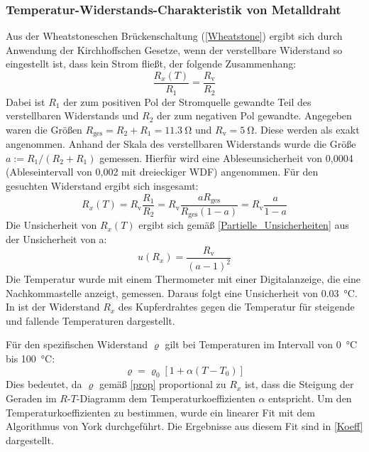 \documentclass[
	a4paper,
	12pt,
	pagesize,
	ngerman
]{scrartcl}
\begin{document}
	\subsubsection{Temperatur-Widerstands-Charakteristik von Metalldraht}
	Aus der Wheatstoneschen Brückenschaltung (\cref{Wheatstone}) ergibt sich durch Anwendung der Kirchhoffschen Gesetze, wenn der verstellbare Widerstand so eingestellt ist, dass kein Strom fließt, der folgende Zusammenhang:
	\begin{equation}
		\frac{R_x(T)}{R_1}=\frac{R_\text{v}}{R_2}
	\end{equation}
	Dabei ist $R_1$ der zum positiven Pol der Stromquelle gewandte Teil des verstellbaren Widerstands und $R_2$ der zum negativen Pol gewandte.
	Angegeben waren die Größen $R_\text{ges}=R_2+R_1=\SI{11,3}{\ohm}$ und $R_\text{v}=\SI{5}{\ohm}$.
	Diese werden als exakt angenommen.
	Anhand der Skala des verstellbaren Widerstands wurde die Größe $a:=R_1/(R_2+R_1)$ gemessen.
	Hierfür wird eine Ableseunsicherheit von 0,0004 (Ableseintervall von 0,002 mit dreieckiger WDF) angenommen.
	Für den gesuchten Widerstand ergibt sich insgesamt:
	\begin{equation}
		R_x(T)=R_\text{v} \frac{R_1}{R_2}=R_\text{v} \frac{aR_\text{ges}}{R_\text{ges}(1-a)}=R_\text{v} \frac{a}{1-a}
	\end{equation}
	Die Unsicherheit von $R_x(T)$ ergibt sich gemäß \cref{Partielle_Unsicherheiten} aus der Unsicherheit von a:
	\begin{equation}
		u(R_x)= \frac{R_\text{v}}{(a-1)^2}
	\end{equation}
	Die Temperatur wurde mit einem Thermometer mit einer Digitalanzeige, die eine Nachkommastelle anzeigt, gemessen.
	Daraus folgt eine Unsicherheit von \SI{0,03}{\celsius}.
	In  ist der Widerstand $R_x$ des Kupferdrahtes gegen die Temperatur für steigende und fallende Temperaturen dargestellt.
	\par 
	Für den spezifischen Widerstand $\varrho $ gilt bei Temperaturen im Intervall von \SI{0}{\celsius} bis \SI{100}{\celsius}:
	\begin{equation}
		\varrho =\varrho_0 \left[ 1+\alpha (T-T_0) \right]
	\end{equation}
	Dies bedeutet, da $\varrho$ gemäß \cref{prop} proportional zu $R_x$ ist, dass die Steigung der Geraden im $R$-$T$-Diagramm dem Temperaturkoeffizienten $\alpha$ entspricht.
	Um den Temperaturkoeffizienten zu bestimmen, wurde ein linearer Fit mit dem Algorithmus von York durchgeführt.
	Die Ergebnisse aus diesem Fit sind in \cref{Koeff} dargestellt.
\end{document}
